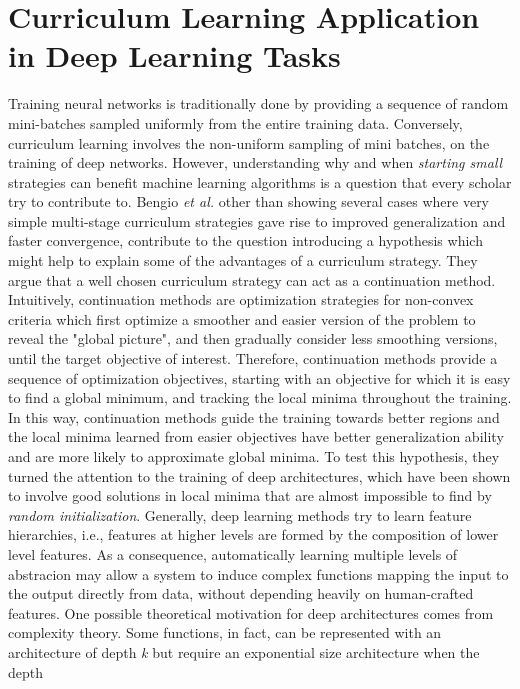 \section{Curriculum Learning Application in Deep Learning Tasks}
Training neural networks is traditionally done by providing a sequence of 
random mini-batches sampled uniformly from the entire training data. Conversely, curriculum learning
involves the non-uniform sampling of mini batches, on the training of deep networks.
However, understanding why and when \textit{starting small} strategies can 
benefit machine learning algorithms is a question that every scholar try to contribute to.
Bengio \textit{et al.} \cite{bengio2009curriculum} other than showing several cases where very simple
multi-stage curriculum strategies gave rise to improved generalization and faster convergence, 
contribute to the question introducing a hypothesis which might help to explain 
some of the advantages of a curriculum strategy. They argue that a well chosen curriculum 
strategy can act as a continuation method. Intuitively, continuation methods are optimization
strategies for non-convex criteria which first optimize a smoother and easier version of the problem to 
reveal the "global picture", and then gradually consider less smoothing versions, until the target objective of 
interest. Therefore, continuation methods provide a sequence of optimization objectives, starting with an objective for which
it is easy to find a global minimum, and tracking the local minima throughout the training. In this way, continuation methods
guide the training towards better regions  and the local minima learned from easier objectives have better
generalization ability and are more likely to approximate global minima.
To test this hypothesis, they turned the attention to the training of deep
architectures, which have been shown to involve good solutions in local minima that are almost impossible to find 
by \textit{random initialization}. Generally, deep learning methods try 
to learn feature hierarchies, i.e., features at higher levels are formed by the composition of lower level features.
As a consequence, automatically learning multiple levels of abstracion may allow a system to induce complex functions mapping the input to the 
output directly from data, without depending heavily on human-crafted features.
One possible theoretical motivation for deep architectures comes from complexity theory. Some functions, in fact, can 
be represented with an architecture of depth \textit{k} but require an exponential size architecture when the depth 
